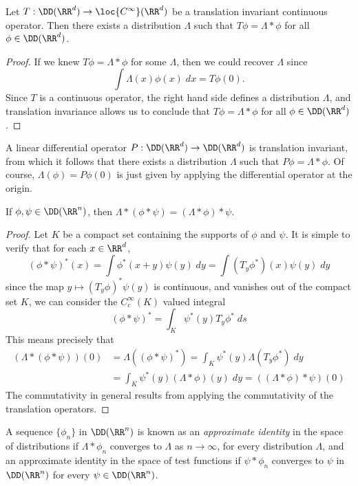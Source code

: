 \begin{theorem}
  Let $T: \DD(\RR^d) \to \loc{C^\infty}(\RR^d)$ be a translation invariant continuous operator. Then there exists a distribution $\Lambda$ such that $T\phi = \Lambda * \phi$ for all $\phi \in \DD(\RR^d)$.
\end{theorem}
\begin{proof}
  If we knew $T\phi = \Lambda * \phi$ for some $\Lambda$, then we could recover $\Lambda$ since
  \[ \int \Lambda(x) \phi(x)\; dx = T \phi(0). \]
  Since $T$ is a continuous operator, the right hand side defines a distribution $\Lambda$, and translation invariance allows us to conclude that $T\phi = \Lambda * \phi$ for all $\phi \in \DD(\RR^d)$.
\end{proof}

\begin{example}
        A linear differential operator $P: \DD(\RR^d) \to \DD(\RR^d)$ is translation invariant, from which it follows that there exists a distribution $\Lambda$ such that $P\phi = \Lambda * \phi$. Of course, $\Lambda(\phi) = P\phi(0)$ is just given by applying the differential operator at the origin.
\end{example}

\begin{theorem}
    If $\phi, \psi \in \DD(\RR^n)$, then $\Lambda * (\phi * \psi) = (\Lambda * \phi) * \psi$.
\end{theorem}
\begin{proof}
  Let $K$ be a compact set containing the supports of $\phi$ and $\psi$. It is simple to verify that for each $x \in \RR^d$,
    \[ (\phi * \psi)^*(x) = \int \phi^*(x + y) \psi(y)\; dy = \int (T_y \phi^*)(x) \psi(y)\; dy \]
    since the map $y \mapsto (T_y \phi)^* \psi(y)$ is continuous, and vanishes out of the compact set $K$, we can consider the $C_c^\infty(K)$ valued integral
    \[ (\phi * \psi)^* = \int_K \psi^*(y) T_y \phi^*\; ds \]
    This means precisely that
    \begin{align*}
        (\Lambda * (\phi * \psi))(0) &= \Lambda((\phi * \psi)^*) = \int_K \psi^*(y) \Lambda(T_y \phi^*)\; dy\\
        &= \int_K \psi^*(y) (\Lambda * \phi)(y)\; dy = ((\Lambda * \phi) * \psi)(0)
    \end{align*}
    The commutativity in general results from applying the commutativity of the translation operators.
\end{proof}

A sequence $\{ \phi_n \}$ in $\DD(\RR^n)$ is known as an {\it approximate identity} in the space of distributions if $\Lambda * \phi_n$ converges to $\Lambda$ as $n \to \infty$, for every distribution $\Lambda$, and an approximate identity in the space of test functions if $\psi * \phi_n$ converges to $\psi$ in $\DD(\RR^n)$ for every $\psi \in \DD(\RR^n)$.

